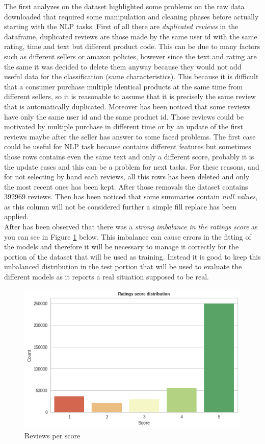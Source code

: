 \documentclass[11pt]{article}
\begin{document}
The first analyzes on the dataset highlighted some problems on the raw data downloaded that required some manipulation and cleaning phases before actually starting with the NLP tasks. First of all there are \textit{duplicated reviews} in the dataframe, duplicated reviews are those made by the same user id with the same rating, time and text but different product code. This can be due to many factors such as different sellers or amazon policies, however since the text and rating are the same it was decided to delete them anyway because they would not add useful data for the classification (same characteristics). This because it is difficult that a consumer purchase multiple identical products at the same time from different sellers, so it is reasonable to assume that it is precisely the same review that is automatically duplicated. Moreover has been noticed that some reviews have only the same user id and the same product id. Those reviews could be motivated by multiple purchase in different time or by an update of the first reviews maybe after the seller has answer to some faced problems. The first case could be useful for NLP task because contains different features but sometimes those rows contains even the same text and only a different score, probably it is the update cases and this can be a problem for next tasks. For these reasons, and for not selecting by hand each reviews, all this rows has been deleted and only the most recent ones has been kept. After those removals the dataset contains $392969$ reviews. Then has been noticed that some summaries contain \textit{null values}, as this column will not be considered further a simple fill replace has been applied. \\
After has been observed that there was a \textit{strong imbalance in the ratings score} as you can see in Figure \ref{scoreImb} below. This imbalance can cause errors in the fitting of the models and therefore it will be necessary to manage it correctly for the portion of the dataset that will be used as training. Instead it is good to keep this unbalanced distribution in the test portion that will be used to evaluate the different models as it reports a real situation supposed to be real. 
\begin{figure}[H]
\begin{center}
  \includegraphics[scale = 0.55]{imbalance.png}
  \caption{Reviews per score}
  \label{scoreImb}
\end{center}
\end{figure}
\end{document}
